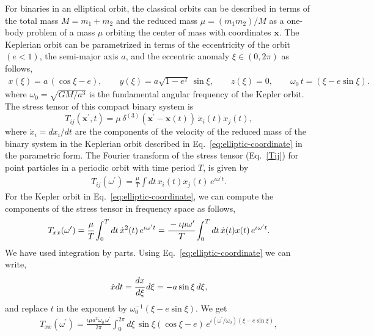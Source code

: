 \documentclass[aps,prd]{revtex4-2}
\begin{document}
\noindent For binaries in an elliptical orbit, the classical orbits can be described in terms of the total mass $M = m_{1} + m_{2}$ and the reduced mass $\mu = (m_1m_2)/ M$ as a one-body problem of a mass $\mu$ orbiting the center of mass with coordinates $\textbf{x}$. The Keplerian orbit can be parametrized in terms of the eccentricity of the orbit $(e<1)$, the semi-major axis $a$, and the eccentric anomaly $\xi \in (0, 2\pi)$ as follows,
\begin{eqnarray}\label{eq:elliptic-coordinate}
 x(\xi) = a\,(\cos\xi - e),\qquad y(\xi) = a \sqrt{1 - e^2}\,\sin\xi, \qquad z(\xi) = 0,\qquad \omega_0\, t = (\xi - e\sin\xi).
\end{eqnarray}
where ${\omega}_{0}=\sqrt{GM/a^3}$ is the fundamental angular frequency of the Kepler orbit. The stress tensor of this compact binary system is
\begin{equation}\label{Tijxt}
T_{ij}(\textbf{x}^{\prime}, t)={\mu}\,{\delta}^{(3)}(\textbf{x}^\prime-\textbf{x}(t))
\,\dot{x}_{i}(t) \dot{x}_{j}(t),
\end{equation}
where $\dot{x}_{i} =dx_{i}/dt$ are the components of the velocity of the reduced mass of the binary system in the Keplerian orbit described in Eq.~\eqref{eq:elliptic-coordinate} in the parametric form. The Fourier transform of the stress tensor (Eq.~\eqref{Tij}) for point particles in a periodic orbit with time period $T$, is given by 
\begin{eqnarray}
    T_{ij}(\omega^\prime) = \frac{\mu}{T}\int dt\, x_{i}(t) x_{j}(t) \,e^{\iota\omega^{\prime} t}.
\end{eqnarray}
For the Kepler orbit in Eq.~\eqref{eq:elliptic-coordinate}, we can compute the components of the stress tensor in frequency space as follows,
\begin{eqnarray}
T_{xx}(\omega^{\prime}) = \cfrac{\mu}{T} \int_{0}^{T} dt\, \dot{x}^{2}(t)\, e^{\iota \omega^{\prime} t} 
= \cfrac{-\iota\mu \omega^{\prime}}{T}\int_{0}^{T} dt\, \dot{x}(t) x(t)\, e^{\iota \omega^{\prime} t}.
\end{eqnarray}
We have used integration by parts. Using Eq.~\eqref{eq:elliptic-coordinate} we can write,
\begin{eqnarray}
\dot{x}dt = \cfrac{dx}{d\xi}\, d\xi = - a \sin \xi\, d\xi,
\end{eqnarray}
and replace $t$ in the exponent by ${\omega}_{0}^{-1}(\xi - e \sin \xi)$. We get 
\begin{eqnarray}
T_{xx}(\omega^{\prime}) = \frac{\iota\mu a^{2}\omega_{0}\,\omega^{\prime}}{2\pi } \int_{0}^{2\pi} d\xi \,\sin\xi (\cos\xi - e)\, e^{\iota(\omega^{\prime}/\omega_{0}) (\xi - e \sin\xi)},
\label{Txx2}
\end{eqnarray}
\end{document}
